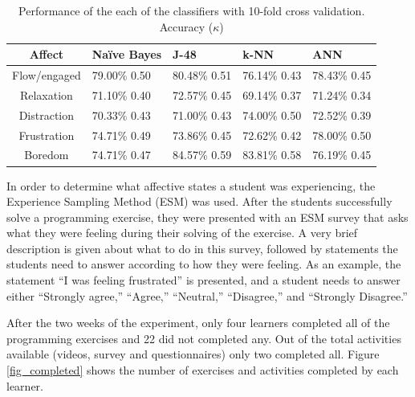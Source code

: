 \documentclass[a4paper]{llncs}
\begin{document}


\begin{table}[!t]
\centering
\caption{Performance of the each of the classifiers with 10-fold cross validation. Accuracy ($\kappa$) }
\label{tab_performance}
    \begin{tabular}{ | c | l | l | l | l | }
    \hline
    Affect          & Na\"ive Bayes           & J-48                & k-NN              & ANN \\
    \hline
    Flow/engaged    & 79.00\% 0.50 & 80.48\% 0.51 & 76.14\% 0.43 & 78.43\% 0.45 \\
    \hline
    Relaxation      & 71.10\% 0.40 & 72.57\% 0.45 & 69.14\% 0.37 & 71.24\% 0.34\\
    \hline
    Distraction     & 70.33\% 0.43 & 71.00\% 0.43 & 74.00\% 0.50 & 72.52\% 0.39\\
    \hline
    Frustration     & 74.71\% 0.49 & 73.86\% 0.45 & 72.62\% 0.42 & 78.00\% 0.50\\
    \hline
    Boredom         & 74.71\% 0.47 & 84.57\% 0.59 & 83.81\% 0.58 & 76.19\% 0.45\\
    \hline
    \end{tabular}
\end{table}



In order to determine what affective states a student was experiencing, the
Experience Sampling Method (ESM) \cite{kubey1996experience} was used.
After the students successfully solve a programming exercise, they were presented
with an ESM survey that asks what they were feeling during their solving of the
exercise. A very brief description is given about what to do in this survey,
followed by statements the students need to answer according to how they were
feeling. As an example, the statement “I was feeling frustrated” is presented,
and a student needs to answer either “Strongly agree,” “Agree,” “Neutral,”
“Disagree,” and “Strongly Disagree.”

After the two weeks of the experiment, only four learners completed all of the
programming exercises and 22 did not completed any. Out of the total activities
available (videos, survey and questionnaires) only two completed all. Figure \ref{fig_completed}
shows the number of exercises and activities completed by each learner.
  
\end{document}
